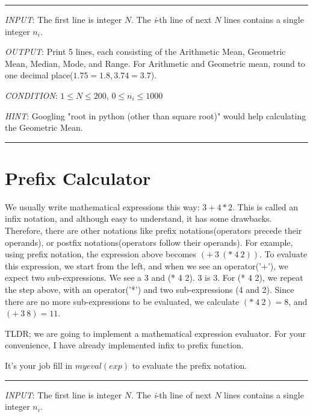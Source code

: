 \documentclass{article}
\begin{document}
\noindent\rule{\textwidth}{0.5pt}
\textit{INPUT}: The first line is integer $N$.
The \textit{i}-th line of next $N$ lines contains a single integer $n_{i}$.

\textit{OUTPUT}: Print 5 lines, each consisting of the Arithmetic Mean, Geometric
Mean, Median, Mode, and Range. For Arithmetic and Geometric mean, round to one
decimal place($1.75 = 1.8, 3.74 = 3.7$).

\textit{CONDITION}: $ 1 \le N \le 200$, $ 0 \le n_{i} \le 1000$

\textit{HINT}: Googling "root in python (other than square root)" would help
calculating the Geometric Mean.
\noindent\rule{\textwidth}{0.5pt}

\section{Prefix Calculator}
We usually write mathematical expressions this way:
$3+4*2$. This is called an infix notation, and although easy to understand, it has
some drawbacks.
Therefore, there are other notations like prefix notations(operators precede
their operands), or postfix notations(operators follow their operands).
For example, using prefix notation, the expression above becomes $(+\ 3\ (*\ 4\
2))$.
To evaluate this expression, we start from the left, and when we see an
operator('+'), we expect two sub-expressions. We see a 3 and (* 4 2).
3 is 3. For (* 4 2), we repeat the step above, with an operator('*') and
two sub-expressions (4 and 2). Since there are no more sub-expressions to be
evaluated, we calculate $(*\ 4\ 2) = 8$, and $(+\ 3\ 8) = 11$.

TLDR; we are going to implement a mathematical expression
evaluator. For your convenience, I have already implemented infix to prefix function.

It's your job fill in $myeval(exp)$ to evaluate the prefix notation.


\noindent\rule{\textwidth}{0.5pt}
\textit{INPUT}: The first line is integer $N$.
The \textit{i}-th line of next $N$ lines contains a single integer $n_{i}$.
\end{document}
